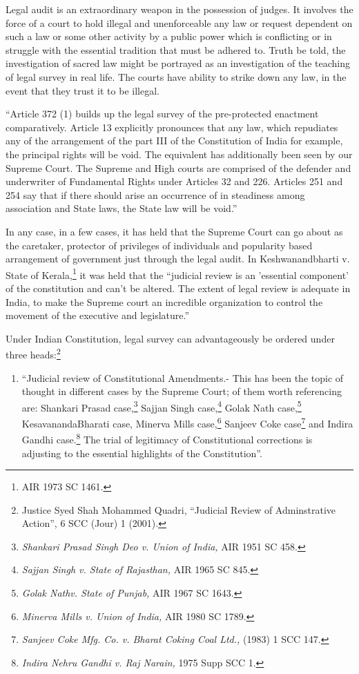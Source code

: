 \begin{multicols}{2}
\noi
Legal audit is an extraordinary weapon in the possession of judges. It involves the force of a
court to hold illegal and unenforceable any law or request dependent on such a law or some
other activity by a public power which is conflicting or in struggle with the essential tradition
that must be adhered to. Truth be told, the investigation of sacred law might be portrayed as
an investigation of the teaching of legal survey in real life. The courts have ability to strike
down any law, in the event that they trust it to be illegal.

\noi
“Article 372 (1) builds up the legal survey of the pre-protected enactment comparatively.
Article 13 explicitly pronounces that any law, which repudiates any of the arrangement of the
part III of the Constitution of India for example, the principal rights will be void. The
equivalent has additionally been seen by our Supreme Court. The Supreme and High courts
are comprised of the defender and underwriter of Fundamental Rights under Articles 32 and
226. Articles 251 and 254 say that if there should arise an occurrence of in steadiness among
association and State laws, the State law will be void.”

\noi
In any case, in a few cases, it has held that the Supreme Court can go about as the caretaker,
protector of privileges of individuals and popularity based arrangement of government just
through the legal audit. In Keshwanandbharti v. State of Kerala,\footnote{AIR 1973 SC 1461.} it was held that the
“judicial review is an 'essential component' of the constitution and can't be altered. The extent
of legal review is adequate in India, to make the Supreme court an incredible organization to
control the movement of the executive and legislature.”

\noi
Under Indian Constitution, legal survey can advantageously be ordered under three heads:\footnote{Justice Syed Shah Mohammed Quadri, “Judicial Review of Adminstrative Action”, 6 SCC (Jour) 1 (2001).}

\vspace{-.3cm}

\noi
\begin{enumerate}[label=\roman*)]
\itemsep=0pt
\item “Judicial review of Constitutional Amendments.- This has been the topic of thought in
different cases by the Supreme Court; of them worth referencing are: Shankari Prasad case,\footnote{\textit{Shankari Prasad Singh Deo v. Union of India,} AIR 1951 SC 458.}
Sajjan Singh case,\footnote{\textit{Sajjan Singh v. State of Rajasthan,} AIR 1965 SC 845.} Golak Nath case,\footnote{\textit{Golak Nathv. State of Punjab,} AIR 1967 SC 1643.} KesavanandaBharati case, Minerva Mills case,\footnote{\textit{Minerva Mills v. Union of India,} AIR 1980 SC 1789.} Sanjeev Coke case\footnote{\textit{Sanjeev Coke Mfg. Co. v. Bharat Coking Coal Ltd.,} (1983) 1 SCC 147.} and Indira Gandhi case.\footnote{\textit{Indira Nehru Gandhi v. Raj Narain,} 1975 Supp SCC 1.} The trial of legitimacy of Constitutional
corrections is adjusting to the essential highlights of the Constitution”.


\end{enumerate}
\end{multicols}
